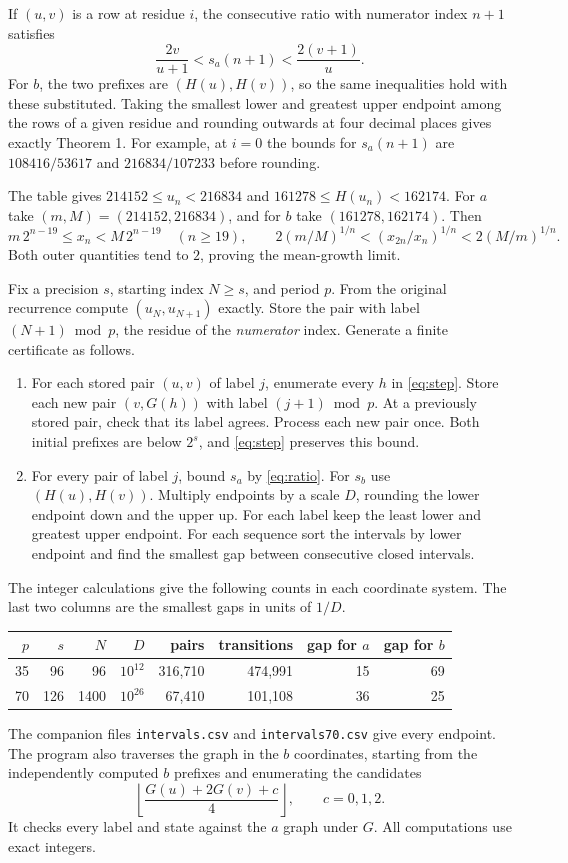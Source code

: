 \documentclass[11pt,letterpaper]{article}
\newcommand{\hd}[1]{\vspace{6pt}{\large\bfseries\color{accent}#1}\par}
\begin{document}
If $(u,v)$ is a row at residue $i$, the consecutive ratio with numerator index $n+1$ satisfies
\begin{equation}
 \frac{2v}{u+1}<s_a(n+1)<\frac{2(v+1)}{u}.
 \label{eq:ratio}
\end{equation}
For $b$, the two prefixes are $(H(u),H(v))$, so the same inequalities hold with these substituted. Taking the smallest lower and greatest upper endpoint among the rows of a given residue and rounding outwards at four decimal places gives exactly Theorem 1. For example, at $i=0$ the bounds for $s_a(n+1)$ are $108416/53617$ and $216834/107233$ before rounding.

The table gives $214152\le u_n<216834$ and $161278\le H(u_n)<162174$. For $a$ take $(m,M)=(214152,216834)$, and for $b$ take $(161278,162174)$. Then
\[
 m\,2^{n-19}\le x_n<M\,2^{n-19}\quad(n\ge19),\qquad
 2(m/M)^{1/n}< (x_{2n}/x_n)^{1/n}<2(M/m)^{1/n}.
\]
Both outer quantities tend to $2$, proving the mean-growth limit.

\newpage
\hd{3. Thirty-five and seventy residue classes}
Fix a precision $s$, starting index $N\ge s$, and period $p$. From the original recurrence compute $(u_N,u_{N+1})$ exactly. Store the pair with label $(N+1)\bmod p$, the residue of the \emph{numerator} index. Generate a finite certificate as follows.
\begin{enumerate}
\item For each stored pair $(u,v)$ of label $j$, enumerate every $h$ in \eqref{eq:step}. Store each new pair $(v,G(h))$ with label $(j+1)\bmod p$. At a previously stored pair, check that its label agrees. Process each new pair once. Both initial prefixes are below $2^s$, and \eqref{eq:step} preserves this bound.
\item For every pair of label $j$, bound $s_a$ by \eqref{eq:ratio}. For $s_b$ use $(H(u),H(v))$. Multiply endpoints by a scale $D$, rounding the lower endpoint down and the upper up. For each label keep the least lower and greatest upper endpoint. For each sequence sort the intervals by lower endpoint and find the smallest gap between consecutive closed intervals.
\end{enumerate}
The integer calculations give the following counts in each coordinate system. The last two columns are the smallest gaps in units of $1/D$.
\begin{center}\small
\begin{tabular}{rrrrrrrr}\toprule
$p$ & $s$ & $N$ & $D$ & pairs & transitions & gap for $a$ & gap for $b$\\\midrule
35 & 96 & 96 & $10^{12}$ & 316,710 & 474,991 & 15 & 69\\
70 & 126 & 1400 & $10^{26}$ & 67,410 & 101,108 & 36 & 25\\\bottomrule
\end{tabular}
\end{center}
The companion files \texttt{intervals.csv} and \texttt{intervals70.csv} give every endpoint. The program also traverses the graph in the $b$ coordinates, starting from the independently computed $b$ prefixes and enumerating the candidates
\[
 \left\lfloor\frac{G(u)+2G(v)+c}{4}\right\rfloor,\qquad c=0,1,2.
\]
It checks every label and state against the $a$ graph under $G$. All computations use exact integers.
\end{document}
